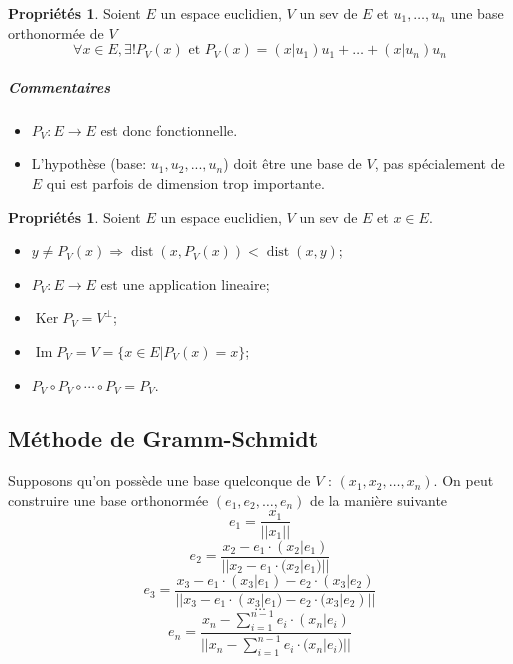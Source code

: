 \documentclass[11pt,a4paper]{article}
\theoremstyle{definition}
\newtheorem{myprop}[mydef]{Propriétés}
\DeclareMathOperator{\dist}{dist}
\DeclareMathOperator{\Ker}{Ker}
\DeclareMathOperator{\newIm}{Im}
\begin{document}
\begin{myprop}
	Soient $E$ un espace euclidien, $V$ un sev de $E$ et $u_1, \ldots, u_n$ une base orthonormée de $V$
	\[ \forall x \in E, \exists! P_V(x)\text{ et }P_V(x) = (x|u_1)u_1 + \ldots + (x|u_n)u_n \]
	\subparagraph{Commentaires}
	\begin{itemize}
		\item $P_V : E \to E$ est donc fonctionnelle.
		\item L'hypothèse (base: $u_1, u_2,..., u_n$) doit être une base de $V$, pas spécialement de $E$ qui est parfois de dimension trop importante.
	\end{itemize}
\end{myprop}

\begin{myprop}
	Soient $E$ un espace euclidien, $V$ un sev de $E$ et $x \in E$.
	\begin{itemize}
		\item $y \neq P_V(x) \Rightarrow \dist(x, P_V(x)) < \dist(x, y)$;
		\item $P_V : E \to E$ est une application lineaire;
		\item $\Ker P_V = V^{\perp}$;
		\item $\newIm P_V = V = \{x \in E | P_V(x) = x\}$;
		\item $P_V \circ P_V \circ \cdots \circ P_V = P_V$.
	\end{itemize}
\end{myprop}

\subsection{Méthode de Gramm-Schmidt}

Supposons qu'on possède une base quelconque de $V$ : $( x_1, x_2, \dots , x_n)$. On peut construire une base orthonormée $(e_1, e_2, \dots, e_n)$ de la manière suivante
\[ e_1 = \frac{x_1}{||x_1||} \]
\[ e_2 = \frac{x_2 - e_1 \cdot (x_2|e_1)}{||x_2 - e_1 \cdot (x_2|e_1)||} \]
\[ e_3 = \frac{x_3 - e_1 \cdot (x_3|e_1) - e_2 \cdot (x_3|e_2)}{||x_3 - e_1 \cdot (x_3|e_1) - e_2 \cdot (x_3|e_2)||} \]
\[ \dots \]
\[ e_n = \frac{ x_n - \sum_{i=1}^{n-1} e_i \cdot (x_n|e_i) }{ || x_n - \sum_{i=1}^{n-1} e_i \cdot (x_n|e_i) || } \]

\end{document}
